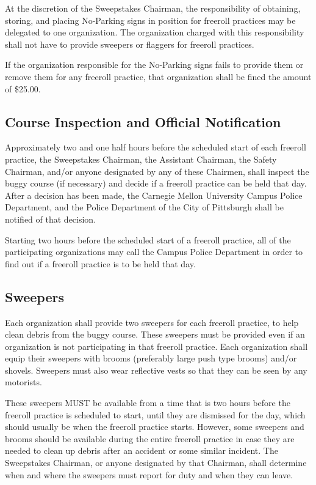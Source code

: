 	At the discretion of the Sweepstakes Chairman, the responsibility of obtaining,
	storing, and placing No-Parking signs in position for freeroll practices may be
	delegated to one organization. The organization charged with this
	responsibility shall not have to provide sweepers or flaggers for freeroll
	practices.

	If the organization responsible for the No-Parking signs fails to provide them
	or remove them for any freeroll practice, that organization shall be fined the
	amount of \$25.00.

\subsection{Course Inspection and Official Notification}

	Approximately two and one half hours before the scheduled start of each
	freeroll practice, the Sweepstakes Chairman, the Assistant Chairman, the Safety
	Chairman, and/or anyone designated by any of these Chairmen, shall inspect the
	buggy course (if necessary) and decide if a freeroll practice can be held that
	day. After a decision has been made, the Carnegie Mellon University Campus
	Police Department, and the Police Department of the City of Pittsburgh shall be
	notified of that decision.

	Starting two hours before the scheduled start of a freeroll practice, all of
	the participating organizations may call the Campus Police Department in order
	to find out if a freeroll practice is to be held that day.

\subsection{Sweepers}

	Each organization shall provide two sweepers for each freeroll practice, to
	help clean debris from the buggy course. These sweepers must be provided even
	if an organization is not participating in that freeroll practice. Each
	organization shall equip their sweepers with brooms (preferably large push type
	brooms) and/or shovels. Sweepers must also wear reflective vests so that they
	can be seen by any motorists.

	These sweepers MUST be available from a time that is two hours before the
	freeroll practice is scheduled to start, until they are dismissed for the day,
	which should usually be when the freeroll practice starts. However, some
	sweepers and brooms should be available during the entire freeroll practice in
	case they are needed to clean up debris after an accident or some similar
	incident. The Sweepstakes Chairman, or anyone designated by that Chairman,
	shall determine when and where the sweepers must report for duty and when they
	can leave.

